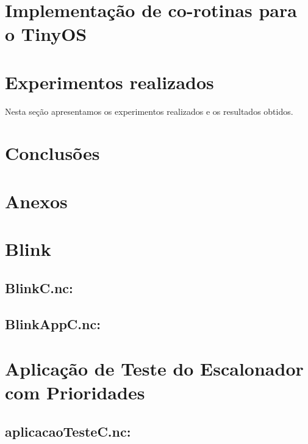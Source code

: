 \documentclass[a4paper, 10pt]{article}
\begin{document}
\section{Implementação de co-rotinas para o TinyOS}


\section{Experimentos realizados}\label{resultados}
Nesta seção apresentamos os experimentos realizados e os resultados obtidos.



\section{Conclusões}\label{conclusoes}

\section{Anexos}
\appendix
\section{Blink}\label{a:Blink}
\subsection{BlinkC.nc:}


\subsection{BlinkAppC.nc:}


\section{Aplicação de Teste do Escalonador com Prioridades}
\subsection{aplicacaoTesteC.nc:}

\end{document}
